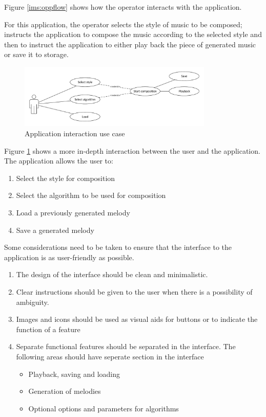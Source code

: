 Figure \ref{ims:oppflow} shows how the operator interacts with the application. 

For this application, the operator selects the style of music to be composed; instructs the application to compose the music according to the selected style and then to instruct the application to either play back the piece of generated music or save it to storage.

\begin{figure}
\centerline{\includegraphics[width=350px]{../images/op_use_case.pdf}}
\caption{Application interaction use case}
\label{ims:opusecase}
\end{figure}

Figure \ref{ims:opusecase} shows a more in-depth interaction between the user and the application. 
The application allows the user to:
\begin{enumerate}
\item Select the style for composition
\item Select the algorithm to be used for composition
\item Load a previously generated melody
\item Save a generated melody
\end{enumerate}

Some considerations need to be taken to ensure that the interface to the application is as user-friendly as possible. 

\begin{enumerate}
\item The design of the interface should be clean and minimalistic. 
\item Clear instructions should be given to the user when there is a possibility of ambiguity.
\item Images and icons should be used as visual aids for buttons or to indicate the function of a feature
\item Separate functional features should be separated in the interface. The following areas should have seperate section in the interface
	\begin{itemize}
	\item Playback, saving and loading
	\item Generation of melodies
	\item Optional options and parameters for algorithms
	\end{itemize} 
\end{enumerate}

